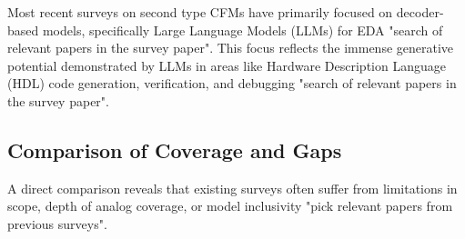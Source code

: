\documentclass{ieeeaccess}
\begin{document}
Most recent surveys on second type CFMs have primarily focused on decoder-based models, specifically Large Language Models (LLMs) for EDA "search of relevant papers in the survey paper".
This focus reflects the immense generative potential demonstrated by LLMs in areas like Hardware Description Language (HDL) code generation, verification, and debugging "search of relevant papers in the survey paper".

\subsection{Comparison of Coverage and Gaps}

A direct comparison reveals that existing surveys often suffer from limitations in scope, depth of analog coverage, or model inclusivity "pick relevant papers from previous surveys".
\end{document}
